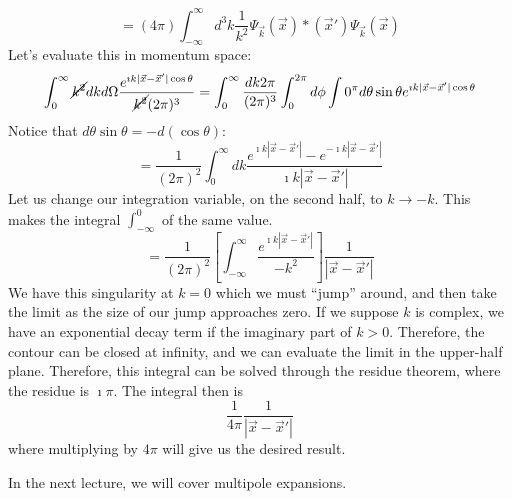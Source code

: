 \documentclass[a4paper,twoside,master.tex]{subfiles}
\begin{document}
\begin{equation}
    =(4\pi)\int_{-\infty}^{\infty} d^3k \frac{1}{k^2}\Psi_{\vec{k}}(\vec{x})*(\vec{x}')\Psi_{\vec{k}}(\vec{x})
\end{equation}
Let's evaluate this in momentum space:
\begin{equation}
    \int_0^\infty \cancel{k^2} dk d\Omega \frac{e^{\imath k |\vec{x}-\vec{x}'| \cos\theta}}{\cancel{k^2}(2\pi)^3} = \int_0^\infty \frac{dk 2\pi}{(2\pi)^3}\int_0^{2\pi} d\phi\int 0^\pi d\theta \sin\theta e^{\imath k|\vec{x}-\vec{x}'|\cos\theta}
\end{equation}
Notice that $d\theta\sin\theta = -d(\cos\theta)$:
\begin{equation}
    = \frac{1}{(2\pi)^2}\int_0^\infty dk \frac{e^{\imath k|\vec{x}-\vec{x}'|} - e^{-\imath k|\vec{x}-\vec{x}'|}}{\imath k|\vec{x}-\vec{x}'|}
\end{equation}
Let us change our integration variable, on the second half, to $k\to-k$. This makes the integral $\int_{-\infty}^0$ of the same value.
\begin{equation}
    = \frac{1}{(2\pi)^2}\left[ \int_{-\infty}^{\infty} \frac{e^{\imath k | \vec{x} - \vec{x}' |}}{-k^2} \right] \frac{1}{|\vec{x}-\vec{x}'|}
\end{equation}
We have this singularity at $k=0$ which we must ``jump'' around, and then take the limit as the size of our jump approaches zero. If we suppose $k$ is complex, we have an exponential decay term if the imaginary part of $k>0$. Therefore, the contour can be closed at infinity, and we can evaluate the limit in the upper-half plane. Therefore, this integral can be solved through the residue theorem, where the residue is $\imath\pi$. The integral then is
\begin{equation}
    \frac{1}{4\pi}\frac{1}{|\vec{x}-\vec{x}'|}
\end{equation}
where multiplying by $4\pi$ will give us the desired result.

In the next lecture, we will cover multipole expansions.
\end{document}
